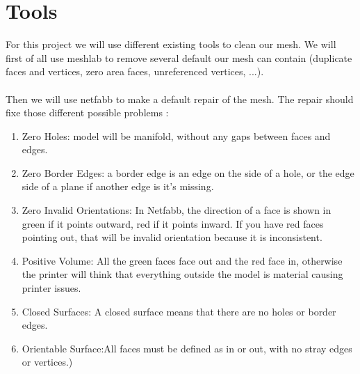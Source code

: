 \documentclass[10pt,conference,compsocconf]{IEEEtran}
\begin{document}
\section{Tools}
\label{sec:tools}
For this project we will use different existing tools to clean our mesh. We will first of all use meshlab to remove several default our mesh can contain (duplicate faces and vertices, zero area faces, unreferenced vertices, ...).\\\\
Then we will use netfabb to make a default repair of the mesh. The repair should fixe those different possible problems : 
\begin{enumerate}
\item Zero Holes: model will be manifold, without any gaps between faces and edges.
\item Zero Border Edges: a border edge is an edge on the side of a hole, or the edge side of a plane if another edge is it's missing.
\item Zero Invalid Orientations: In Netfabb, the direction of a face is shown in green if it points outward, red if it points inward. If you have red faces pointing out, that will be invalid orientation because it is inconsistent.
\item Positive Volume: All the green faces face out and the red face in, otherwise the printer will think that everything outside the model is material causing printer issues.
\item Closed Surfaces: A closed surface means that there are no holes or border edges.
\item Orientable Surface:All faces must be defined as in or out, with no stray edges or vertices.)
\end{enumerate}
\end{document}
